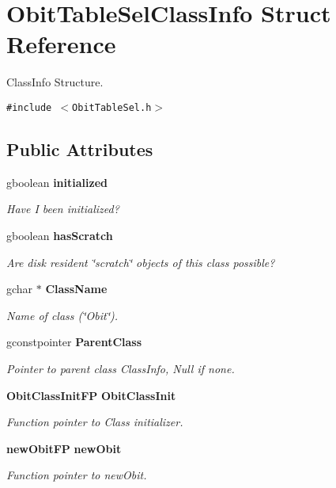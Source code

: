 \section{Obit\-Table\-Sel\-Class\-Info Struct Reference}
\label{structObitTableSelClassInfo}
Class\-Info Structure.  


{\tt \#include $<$Obit\-Table\-Sel.h$>$}

\subsection*{Public Attributes}
\begin{CompactItemize}
\item 
gboolean {\bf initialized}
\begin{CompactList}\small\item\em Have I been initialized? \item\end{CompactList}\item 
gboolean {\bf has\-Scratch}
\begin{CompactList}\small\item\em Are disk resident \char`\"{}scratch\char`\"{} objects of this class possible? \item\end{CompactList}\item 
gchar $\ast$ {\bf Class\-Name}
\begin{CompactList}\small\item\em Name of class (\char`\"{}Obit\char`\"{}). \item\end{CompactList}\item 
gconstpointer {\bf Parent\-Class}
\begin{CompactList}\small\item\em Pointer to parent class Class\-Info, Null if none. \item\end{CompactList}\item 
{\bf Obit\-Class\-Init\-FP} {\bf Obit\-Class\-Init}
\begin{CompactList}\small\item\em Function pointer to Class initializer. \item\end{CompactList}\item 
{\bf new\-Obit\-FP} {\bf new\-Obit}
\begin{CompactList}\small\item\em Function pointer to new\-Obit. \item\end{CompactList}\item 

\end{CompactItemize}
